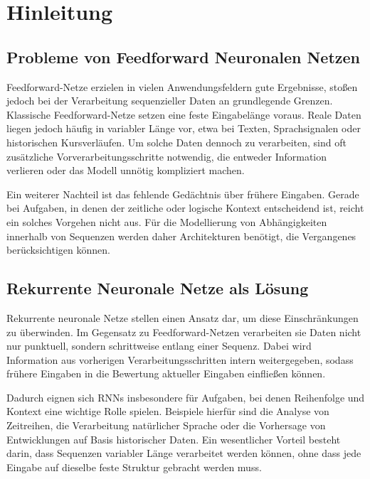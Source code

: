 \chapter{Hinleitung}

\section{Probleme von Feedforward Neuronalen Netzen}
Feedforward-Netze erzielen in vielen Anwendungsfeldern gute Ergebnisse, stoßen jedoch bei der Verarbeitung
sequenzieller Daten an grundlegende Grenzen.
Klassische Feedforward-Netze setzen eine feste Eingabelänge voraus. Reale Daten liegen
jedoch häufig in variabler Länge vor, etwa bei Texten, Sprachsignalen oder historischen Kursverläufen. Um solche
Daten dennoch zu verarbeiten, sind oft zusätzliche Vorverarbeitungsschritte notwendig, die entweder Information
verlieren oder das Modell unnötig kompliziert machen.

Ein weiterer Nachteil ist das fehlende Gedächtnis über frühere Eingaben.
Gerade bei Aufgaben, in denen der zeitliche oder logische Kontext entscheidend ist, reicht ein solches Vorgehen
nicht aus. Für die Modellierung von Abhängigkeiten innerhalb von Sequenzen werden daher Architekturen benötigt, die
Vergangenes berücksichtigen können.

\section{Rekurrente Neuronale Netze als Lösung}
Rekurrente neuronale Netze stellen einen Ansatz dar, um diese Einschränkungen zu überwinden. Im Gegensatz zu
Feedforward-Netzen verarbeiten sie Daten nicht nur punktuell, sondern schrittweise entlang einer Sequenz. Dabei wird
Information aus vorherigen Verarbeitungsschritten intern weitergegeben, sodass frühere Eingaben in die Bewertung
aktueller Eingaben einfließen können.

Dadurch eignen sich \acp{RNN} insbesondere für Aufgaben, bei denen Reihenfolge und Kontext eine wichtige Rolle
spielen. Beispiele hierfür sind die Analyse von Zeitreihen, die Verarbeitung natürlicher Sprache oder die Vorhersage
von Entwicklungen auf Basis historischer Daten. Ein wesentlicher Vorteil besteht darin, dass Sequenzen variabler
Länge verarbeitet werden können, ohne dass jede Eingabe auf dieselbe feste Struktur gebracht werden muss.
